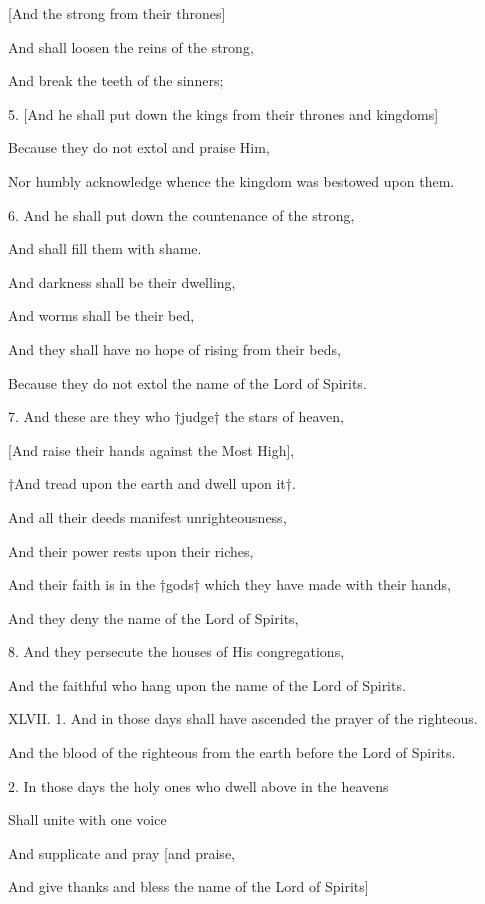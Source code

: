 [And the strong from their thrones]

And shall loosen the reins of the strong,

And break the teeth of the sinners;

5. [And he shall put down the kings from their thrones and kingdoms]

Because they do not extol and praise Him,

Nor humbly acknowledge whence the kingdom was bestowed upon them.

6. And he shall put down the countenance of the strong,

And shall fill them with shame.

And darkness shall be their dwelling,

And worms shall be their bed,

And they shall have no hope of rising from their beds,

Because they do not extol the name of the Lord of Spirits.

7. And these are they who †judge† the stars of heaven,

[And raise their hands against the Most High],

†And tread upon the earth and dwell upon it†.

And all their deeds manifest unrighteousness,

And their power rests upon their riches,

And their faith is in the †gods† which they have made with their hands,

And they deny the name of the Lord of Spirits,

8. And they persecute the houses of His congregations,

And the faithful who hang upon the name of the Lord of Spirits.


XLVII. 1. And in those days shall have ascended the prayer of the righteous.

And the blood of the righteous from the earth before the Lord of Spirits.

2. In those days the holy ones who dwell above in the heavens

Shall unite with one voice

And supplicate and pray [and praise,

And give thanks and bless the name of the Lord of Spirits]

